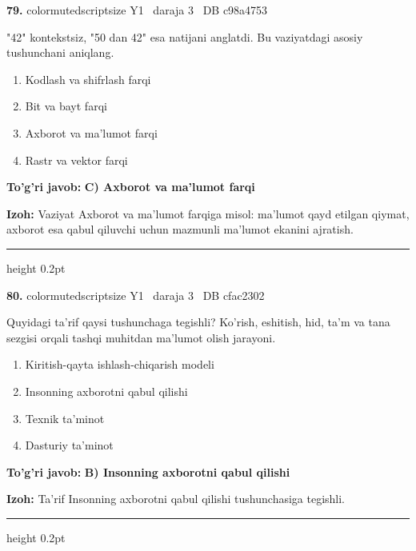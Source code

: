 \documentclass[10pt,a4paper,oneside]{article}
\begin{document}
\noindent\textbf{\color{ink}79.}  {color{muted}scriptsize Y1 \textbullet\ daraja 3 \textbullet\ DB c98a4753}
\par
"42" kontekstsiz, "50 dan 42" esa natijani anglatdi. Bu vaziyatdagi asosiy tushunchani aniqlang.
\begin{enumerate}[label=\Alph*),leftmargin=9mm]
\item Kodlash va shifrlash farqi
\item Bit va bayt farqi
\item Axborot va ma'lumot farqi
\item Rastr va vektor farqi
\end{enumerate}
\begin{tcolorbox}[enhanced,breakable,colback=teal!4,colframe=teal!50!black,boxrule=0.5pt,arc=1.1mm,left=3mm,right=3mm,top=1.7mm,bottom=1.7mm,before skip=2mm,after skip=2mm]
\textbf{\color{teal}To'g'ri javob:} \textbf{C) Axborot va ma'lumot farqi}
\par\smallskip
\textbf{Izoh:} Vaziyat Axborot va ma'lumot farqiga misol: ma'lumot qayd etilgan qiymat, axborot esa qabul qiluvchi uchun mazmunli ma'lumot ekanini ajratish.
\end{tcolorbox}
\vspace{2mm}\hrule height 0.2pt \vspace{3mm}

\noindent\textbf{\color{ink}80.}  {color{muted}scriptsize Y1 \textbullet\ daraja 3 \textbullet\ DB cfac2302}
\par
Quyidagi ta'rif qaysi tushunchaga tegishli? Ko'rish, eshitish, hid, ta'm va tana sezgisi orqali tashqi muhitdan ma'lumot olish jarayoni.
\begin{enumerate}[label=\Alph*),leftmargin=9mm]
\item Kiritish-qayta ishlash-chiqarish modeli
\item Insonning axborotni qabul qilishi
\item Texnik ta'minot
\item Dasturiy ta'minot
\end{enumerate}
\begin{tcolorbox}[enhanced,breakable,colback=teal!4,colframe=teal!50!black,boxrule=0.5pt,arc=1.1mm,left=3mm,right=3mm,top=1.7mm,bottom=1.7mm,before skip=2mm,after skip=2mm]
\textbf{\color{teal}To'g'ri javob:} \textbf{B) Insonning axborotni qabul qilishi}
\par\smallskip
\textbf{Izoh:} Ta'rif Insonning axborotni qabul qilishi tushunchasiga tegishli.
\end{tcolorbox}
\vspace{2mm}\hrule height 0.2pt \vspace{3mm}
\end{document}
